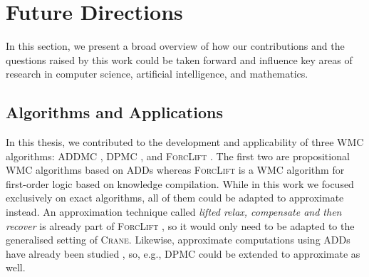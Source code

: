 
\section{Future Directions}\label{sec:future}

In this section, we present a broad overview of how our contributions and the
questions raised by this work could be taken forward and influence key areas of
research in computer science, artificial intelligence, and mathematics.

\subsection{Algorithms and Applications}


In this thesis, we contributed to the development and applicability of three WMC
algorithms: \textsc{ADDMC} \citep{DBLP:conf/aaai/DudekPV20}, \textsc{DPMC}
\citep{DBLP:conf/cp/DudekPV20}, and \textsc{ForcLift}
\citep{DBLP:conf/ijcai/BroeckTMDR11}. The first two are propositional WMC
algorithms based on ADDs whereas \textsc{ForcLift} is a WMC algorithm for
first-order logic based on knowledge compilation. While in this work we focused
exclusively on exact algorithms, all of them could be adapted to approximate
instead. An approximation technique called \emph{lifted relax, compensate and
  then recover} is already part of \textsc{ForcLift}
\citep{DBLP:conf/uai/BroeckCD12}, so it would only need to be adapted to the
generalised setting of \textsc{Crane}. Likewise, approximate computations using
ADDs have already been studied \citep{DBLP:conf/nips/St-AubinHB00}, so, e.g.,
\textsc{DPMC} could be extended to approximate as well.

